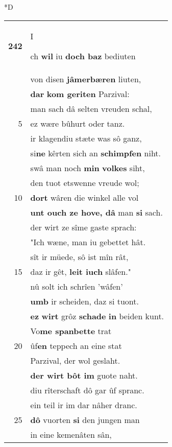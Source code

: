 \documentclass[8pt,a4paper,notitlepage]{article}
\begin{document}
\begin{table}[ht]
\begin{minipage}[t]{0.5\linewidth}
\small
\begin{center}*D
\end{center}
\begin{tabular}{rl}
\textbf{242} & \begin{large}I\end{large}ch \textbf{wil} iu \textbf{doch baz} bediuten\\ 
 & von disen \textbf{jâmerbæren} liuten,\\ 
 & \textbf{dar} \textbf{kom geriten} Parzival:\\ 
 & man sach dâ selten vreuden schal,\\ 
5 & ez wære bûhurt oder tanz.\\ 
 & ir klagendiu stæte was sô ganz,\\ 
 & si\textbf{ne} kêrten sich an \textbf{schimpfen} niht.\\ 
 & swâ man noch \textbf{min} \textbf{volkes} siht,\\ 
 & den tuot etswenne vreude wol;\\ 
10 & \textbf{dort} wâren die winkel alle vol\\ 
 & \textbf{unt ouch ze hove, dâ} man \textbf{si} sach.\\ 
 & der wirt ze sîme gaste sprach:\\ 
 & "Ich wæne, man iu gebettet hât.\\ 
 & sît ir müede, sô ist mîn rât,\\ 
15 & daz ir gêt, \textbf{leit iuch} slâfen."\\ 
 & nû solt ich schrîen 'wâfen'\\ 
 & \textbf{umb} ir scheiden, daz si tuont.\\ 
 & \textbf{ez} \textbf{wirt} grôz \textbf{schade} \textbf{in} beiden kunt.\\ 
 & Vo\textbf{me spanbette} trat\\ 
20 & ûf\textbf{en} teppech an eine stat\\ 
 & Parzival, der wol geslaht.\\ 
 & \textbf{der wirt bôt im} guote naht.\\ 
 & diu rîterschaft dô gar ûf spranc.\\ 
 & ein teil ir im dar nâher dranc.\\ 
25 & \textbf{dô} vuorten \textbf{si} den jungen man\\ 
 & in eine kemenâten sân,\\ 

\end{tabular}
\end{minipage}
\end{table}
\end{document}
